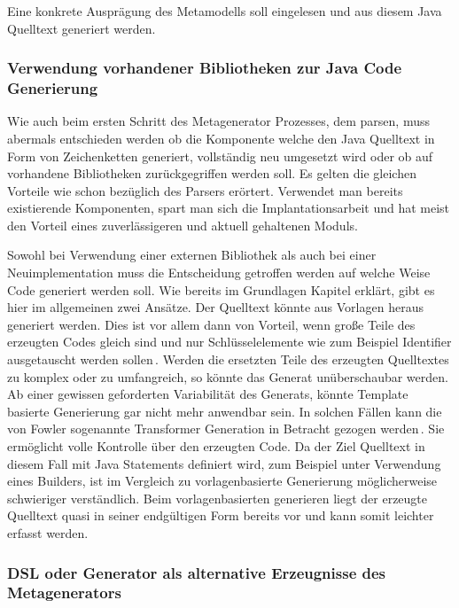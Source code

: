 \documentclass[12pt,oneside,a4paper,parskip]{scrbook}
\begin{document}
Eine konkrete Ausprägung des Metamodells soll eingelesen und aus diesem Java Quelltext generiert werden.

\subsubsection{Verwendung vorhandener Bibliotheken zur Java Code Generierung}

Wie auch beim ersten Schritt des Metagenerator Prozesses, dem parsen, muss abermals entschieden werden ob die Komponente welche den Java Quelltext in Form von Zeichenketten generiert, vollständig neu umgesetzt wird oder ob auf vorhandene Bibliotheken zurückgegriffen werden soll. Es gelten die gleichen Vorteile wie schon bezüglich des Parsers erörtert. Verwendet man bereits existierende Komponenten, spart man sich die Implantationsarbeit und hat meist den Vorteil eines zuverlässigeren und aktuell gehaltenen Moduls.

Sowohl bei Verwendung einer externen Bibliothek als auch bei einer Neuimplementation muss die Entscheidung getroffen werden auf welche Weise Code generiert werden soll. Wie bereits im Grundlagen Kapitel erklärt, gibt es hier im allgemeinen zwei Ansätze. Der Quelltext könnte aus Vorlagen heraus generiert werden. Dies ist vor allem dann von Vorteil, wenn große Teile des erzeugten Codes gleich sind und nur Schlüsselelemente wie zum Beispiel Identifier ausgetauscht werden sollen\,\cite[S. 125]{fowler2010}. Werden die ersetzten Teile des erzeugten Quelltextes zu komplex oder zu umfangreich, so könnte das Generat unüberschaubar werden. Ab einer gewissen geforderten Variabilität des Generats, könnte Template basierte Generierung gar nicht mehr anwendbar sein. In solchen Fällen kann die von Fowler sogenannte Transformer Generation in Betracht gezogen werden\,\cite[S. 125]{fowler2010}. Sie ermöglicht volle Kontrolle über den erzeugten Code. Da der Ziel Quelltext in diesem Fall mit Java Statements definiert wird, zum Beispiel unter Verwendung eines Builders, ist im Vergleich zu vorlagenbasierte Generierung möglicherweise schwieriger verständlich. Beim vorlagenbasierten generieren liegt der erzeugte Quelltext quasi in seiner endgültigen Form bereits vor und kann somit leichter erfasst werden.

\subsubsection{DSL oder Generator als alternative Erzeugnisse des Metagenerators}
\end{document}
